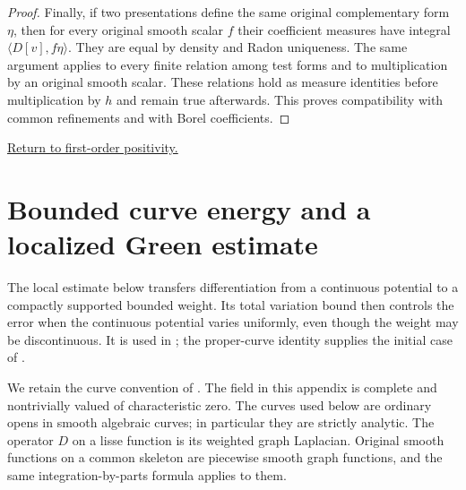 \documentclass[11pt,reqno]{amsart}
\theoremstyle{definition}
\theoremstyle{remark}
\newtheorem{remark}[theorem]{Remark}
\numberwithin{equation}{section}
\newcommand{\returnlink}[2]{\par\smallskip\noindent
\hyperref[#1]{\textcolor{ReturnLink}{Return to #2.}}\par}
\begin{document}
\begin{proof}
Finally, if two presentations define the same original complementary
form $\eta$, then for every original smooth scalar $f$ their
coefficient measures have integral $\langle D[v],f\eta\rangle$.
They are equal by density and Radon uniqueness. The same argument
applies to every finite relation among test forms and to multiplication
by an original smooth scalar. These relations hold as measure
identities before multiplication by $h$ and remain true afterwards.
This proves compatibility with common refinements and with
Borel coefficients.
\end{proof}


\returnlink{sec:first-order}{first-order positivity}

\section{Bounded curve energy and a localized Green estimate}
\label{sec:curve-energy}

The local estimate below transfers differentiation from a continuous
potential to a compactly supported bounded weight. Its total variation
bound then controls the error when the continuous potential varies
uniformly, even though the weight may be discontinuous. It is used in
; the proper-curve identity supplies
the initial case of .

We retain the curve convention of .
The field in this appendix is complete and nontrivially valued of
characteristic zero. The curves used below are ordinary opens in
smooth algebraic curves; in particular they are strictly analytic.
The operator \(D\) on a lisse function is its weighted graph
Laplacian. Original smooth functions on a common skeleton are
piecewise smooth graph functions, and the same integration-by-parts
formula applies to them.
\end{document}
